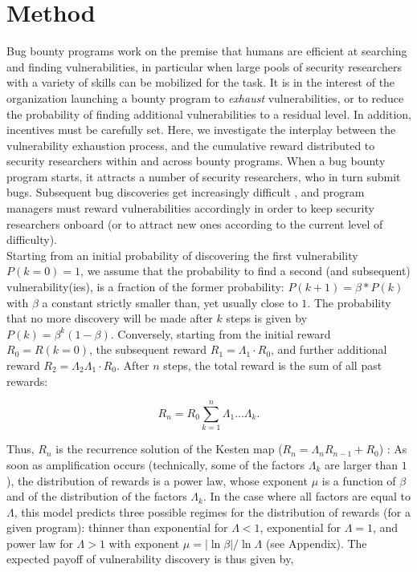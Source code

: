 \section{Method}
\label{sec:method}
Bug bounty programs work on the premise that humans are efficient at searching and finding vulnerabilities, in particular when large pools of security researchers with a variety of skills can be mobilized for the task. It is in the interest of the organization launching a bounty program to {\it exhaust} vulnerabilities, or to reduce the probability of finding additional vulnerabilities to a residual level. In addition, incentives must be carefully set. Here, we investigate the interplay between the vulnerability exhaustion process, and the cumulative reward distributed to security researchers within and across bounty programs. When a bug bounty program starts, it attracts a number of security researchers, who in turn submit bugs. Subsequent bug discoveries get increasingly difficult \cite{brady1999murphy}, and program managers must reward vulnerabilities accordingly in order to keep security researchers onboard (or to attract new ones according to the current level of difficulty). \\ %

Starting from an initial probability of discovering the first vulnerability $P(k=0) = 1$, we assume that the probability to find a second (and subsequent) vulnerability(ies), is a fraction of the former probability: $P(k+1) = \beta * P(k)$ with $\beta$ a constant strictly smaller than, yet usually close to $1$. 
The probability that no more discovery will be made after $k$ steps is given by $P(k) = \beta^{k} (1-\beta)$. Conversely, starting from the initial reward $R_0 = R(k=0)$, the subsequent reward $R_1 = \Lambda_1 \cdot R_0$, and further additional reward $ R_2 = \Lambda_2 \Lambda_1 \cdot R_{0}$. After $n$ steps, the total reward is the sum of all past rewards: 

\begin{equation}
R_{n} = R_{0} \sum_{k=1}^{n} \Lambda_1 ... \Lambda_k.
\end{equation}

Thus, $R_{n}$ is the recurrence solution of the  
Kesten map ($R_{n} = \Lambda_n R_{n-1} +R_0$)
\cite{kesten1973random,sornette1997convergent}:  As soon as amplification occurs (technically, 
some of the factors $\Lambda_k$ are larger than $1$), the distribution
of rewards is a power law, whose exponent $\mu$ is a function of $\beta$
and of the distribution of the factors $\Lambda_k$. In the case where
all factors are equal to $\Lambda$, this model predicts three possible regimes for the distribution of rewards (for a given program): thinner than exponential for $\Lambda < 1$, exponential for $\Lambda = 1$, and power law for $\Lambda > 1$ with exponent $\mu = |\ln \beta|/ \ln \Lambda$ (see Appendix). The expected payoff of vulnerability discovery is thus given by,

